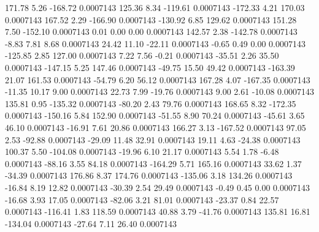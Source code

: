       171.78        5.26     -168.72     0.0007143
      125.36        8.34     -119.61     0.0007143
     -172.33        4.21      170.03     0.0007143
      167.52        2.29     -166.90     0.0007143
     -130.92        6.85      129.62     0.0007143
      151.28        7.50     -152.10     0.0007143
        0.01        0.00        0.00     0.0007143
      142.57        2.38     -142.78     0.0007143
       -8.83        7.81        8.68     0.0007143
       24.42       11.10      -22.11     0.0007143
       -0.65        0.49        0.00     0.0007143
     -125.85        2.85      127.00     0.0007143
        7.22        7.56       -0.21     0.0007143
      -35.51        2.26       35.50     0.0007143
     -147.15        5.25      147.46     0.0007143
      -49.75       15.50       49.42     0.0007143
     -163.39       21.07      161.53     0.0007143
      -54.79        6.20       56.12     0.0007143
      167.28        4.07     -167.35     0.0007143
      -11.35       10.17        9.00     0.0007143
       22.73        7.99      -19.76     0.0007143
        9.00        2.61      -10.08     0.0007143
      135.81        0.95     -135.32     0.0007143
      -80.20        2.43       79.76     0.0007143
      168.65        8.32     -172.35     0.0007143
     -150.16        5.84      152.90     0.0007143
      -51.55        8.90       70.24     0.0007143
      -45.61        3.65       46.10     0.0007143
      -16.91        7.61       20.86     0.0007143
      166.27        3.13     -167.52     0.0007143
       97.05        2.53      -92.88     0.0007143
      -29.09       11.48       32.91     0.0007143
       19.11        4.63      -24.38     0.0007143
      100.37        5.50     -104.08     0.0007143
      -19.96        6.10       21.17     0.0007143
        5.54        1.78       -6.48     0.0007143
      -88.16        3.55       84.18     0.0007143
     -164.29        5.71      165.16     0.0007143
       33.62        1.37      -34.39     0.0007143
      176.86        8.37      174.76     0.0007143
     -135.06        3.18      134.26     0.0007143
      -16.84        8.19       12.82     0.0007143
      -30.39        2.54       29.49     0.0007143
       -0.49        0.45        0.00     0.0007143
      -16.68        3.93       17.05     0.0007143
      -82.06        3.21       81.01     0.0007143
      -23.37        0.84       22.57     0.0007143
     -116.41        1.83      118.59     0.0007143
       40.88        3.79      -41.76     0.0007143
      135.81       16.81     -134.04     0.0007143
      -27.64        7.11       26.40     0.0007143
